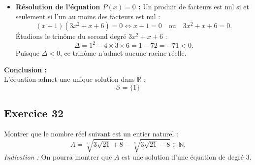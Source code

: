 \documentclass[11pt,a4paper]{article}
\begin{document}
\begin{correctionbox}
\begin{enumerate}
\begin{itemize}[leftmargin=*,label=\textbullet]
        \item \textbf{Résolution de l'équation $P(x) = 0$ :}
        Un produit de facteurs est nul si et seulement si l'un au moins des facteurs est nul :
        \[
        (x - 1)(3x^2 + x + 6) = 0 \iff x - 1 = 0 \quad \text{ou} \quad 3x^2 + x + 6 = 0.
        \]
        Étudions le trinôme du second degré $3x^2 + x + 6$ :
        \[
        \Delta = 1^2 - 4 \times 3 \times 6 = 1 - 72 = -71 < 0.
        \]
        Puisque $\Delta < 0$, ce trinôme n'admet aucune racine réelle.
    \end{itemize}

    \textbf{Conclusion :}\\
    L'équation admet une unique solution dans $\mathbb{R}$ :
    \[
    \boxed{\mathcal{S} = \{ 1 \}}
    \]
\end{enumerate}
\end{correctionbox}

\subsection*{Exercice 32}
Montrer que le nombre réel suivant est un entier naturel :
\[
A = \sqrt[3]{3\sqrt{21} + 8} - \sqrt[3]{3\sqrt{21} - 8} \in \mathbb{N}.
\]
\textit{Indication :} On pourra montrer que $A$ est une solution d'une équation de degré 3.
\end{document}
